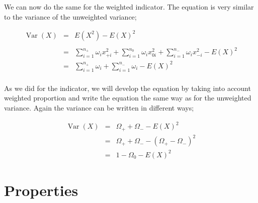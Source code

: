 \documentclass[12pt,a4paper,oneside]{book}
\DeclareMathOperator{\Var}{Var}
\begin{document}
We can now do the same for the weighted indicator. The equation is very similar to the variance of the unweighted variance;



\begin{eqnarray}
\Var(X) &=&  E\left( X^2\right) - E\left( X\right)^2 \nonumber \\ \nonumber \\
    &=& \sum_{i=1}^{n_+} \omega_i x_{+i}^2 + \sum_{i=1}^{n_0} \omega_i x_{0i}^2  + \sum_{i=1}^{n_-} \omega_i x_{-i}^2 - E(X)^2 \\
    &=& \sum_{i=1}^{n_+} \omega_i + \sum_{i=1}^{n_-} \omega_i - E(X)^2 \nonumber \\
\end{eqnarray}

As we did for the indicator, we will develop the equation by taking into account weighted proportion and write the equation the same way as for the unweighted variance. 
Again the variance can be written in different ways;

\begin{eqnarray}
\Var(X) &=& \Omega_+ + \Omega_- - E ( X )^2 \\
	&=& \Omega_+ + \Omega_- - ( \Omega_+ - \Omega_- )^2 \\
    &=& 1 - \Omega_{0} - E(X)^2 \label{eq:var3 weighted}
\end{eqnarray}


\section{Properties}
    \label{sec:properties variance}
\end{document}
